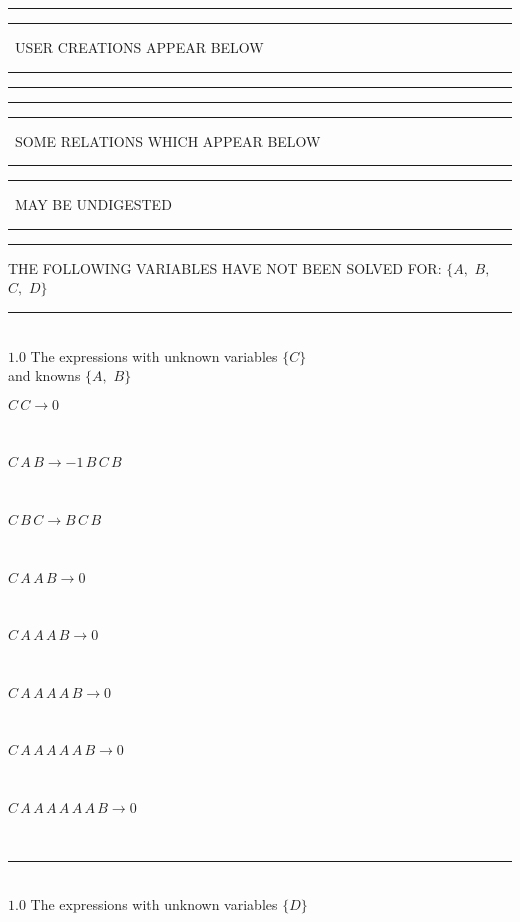 \documentclass[rep10,leqno]{report}
\begin{document}
\rule[2pt]{6in}{1pt}\hfil\break
\rule[2.5pt]{1.701in}{1pt}
\ USER CREATIONS APPEAR BELOW\ 
\rule[2.5pt]{1.701in}{1pt}\hfil\break
\rule[2pt]{6in}{1pt}\hfil\break
\rule[2pt]{6in}{4pt}\hfil\break
\rule[2pt]{1.45in}{4pt}
\ SOME RELATIONS WHICH APPEAR BELOW\ 
\rule[2pt]{1.45in}{4pt}\hfil\break
\rule[2pt]{2.18in}{4pt}
\ MAY BE UNDIGESTED\ 
\rule[2pt]{2.18in}{4pt}\hfil\break
\rule[2pt]{6in}{4pt}\hfil\break
THE FOLLOWING VARIABLES HAVE NOT BEEN SOLVED FOR:\hfil\break
$\{A,
$ $
B,
$ $
C,
$ $
D\}$
\smallskip\\
\rule[3pt]{6in}{.7pt}\\
$1.0$  The expressions with unknown variables $\{C\}$\\
and knowns $\{A,
$ $
B\}$\smallskip\\
\begin{minipage}{6in}
$
C\,
 C\rightarrow 0
$
\end{minipage}\medskip \\
\begin{minipage}{6in}
$
C\,
 A\,
 B\rightarrow -1\,
 B\,
 C\,
 B
$
\end{minipage}\medskip \\
\begin{minipage}{6in}
$
C\,
 B\,
 C\rightarrow B\,
 C\,
 B
$
\end{minipage}\medskip \\
\begin{minipage}{6in}
$
C\,
 A\,
 A\,
 B\rightarrow 0
$
\end{minipage}\medskip \\
\begin{minipage}{6in}
$
C\,
 A\,
 A\,
 A\,
 B\rightarrow 0
$
\end{minipage}\medskip \\
\begin{minipage}{6in}
$
C\,
 A\,
 A\,
 A\,
 A\,
 B\rightarrow 0
$
\end{minipage}\medskip \\
\begin{minipage}{6in}
$
C\,
 A\,
 A\,
 A\,
 A\,
 A\,
 B\rightarrow 0
$
\end{minipage}\medskip \\
\begin{minipage}{6in}
$
C\,
 A\,
 A\,
 A\,
 A\,
 A\,
 A\,
 B\rightarrow 0
$
\end{minipage}\\
\rule[3pt]{6in}{.7pt}\\
$1.0$  The expressions with unknown variables $\{D\}$\\
\end{document}
